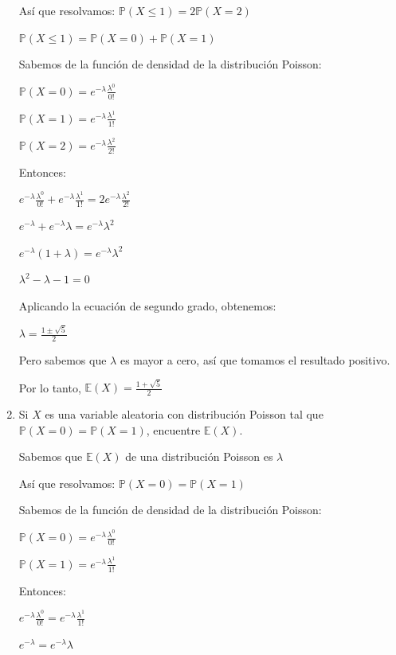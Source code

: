 \documentclass[11pt,a4paper]{report}
\begin{document}
\begin{enumerate}
{			Así que resolvamos: $\mathbb{P}(X \leq 1) = 2\mathbb{P}(X = 2)$

			$\mathbb{P}(X \leq 1) = \mathbb{P}(X = 0) + \mathbb{P}(X = 1)$

			Sabemos de la función de densidad de la distribución Poisson:

			$\mathbb{P}(X = 0) = e^{-\lambda} \frac{\lambda^{0}}{0!}$

			$\mathbb{P}(X = 1) = e^{-\lambda} \frac{\lambda^{1}}{1!}$

			$\mathbb{P}(X = 2) = e^{-\lambda} \frac{\lambda^{2}}{2!}$

			Entonces:

			$e^{-\lambda} \frac{\lambda^{0}}{0!} + e^{-\lambda} \frac{\lambda^{1}}{1!} = 2 e^{-\lambda} \frac{\lambda^{2}}{2!}$

			$e^{-\lambda}  + e^{-\lambda} \lambda =  e^{-\lambda} \lambda^{2}$

			$e^{-\lambda} (1 + \lambda) =  e^{-\lambda} \lambda^{2}$

			 $\lambda^{2} - \lambda - 1 = 0$

			 Aplicando la ecuación de segundo grado, obtenemos:

			 $\lambda = \frac{1 \pm \sqrt{5}}{2}$
			 
			 Pero sabemos que $\lambda$ es mayor a cero, así que tomamos el resultado positivo.

			 Por lo tanto, $ \mathbb{E}(X) = \frac{1 + \sqrt{5}}{2}$\\

		}

		\item{
			Si $X$ es una variable aleatoria con distribución Poisson tal que
			$\mathbb{P}(X = 0) = \mathbb{P}(X = 1)$, encuentre $\mathbb{E}(X)$.

			Sabemos que $\mathbb{E}(X)$ de una distribución Poisson es $\lambda$

			Así que resolvamos: $\mathbb{P}(X = 0) = \mathbb{P}(X = 1)$

			Sabemos de la función de densidad de la distribución Poisson:

			$\mathbb{P}(X = 0) = e^{-\lambda} \frac{\lambda^{0}}{0!}$

			$\mathbb{P}(X = 1) = e^{-\lambda} \frac{\lambda^{1}}{1!}$


			Entonces:

			$e^{-\lambda} \frac{\lambda^{0}}{0!} = e^{-\lambda} \frac{\lambda^{1}}{1!}$

			$e^{-\lambda}  =  e^{-\lambda} \lambda$

}
\end{enumerate}
\end{document}
